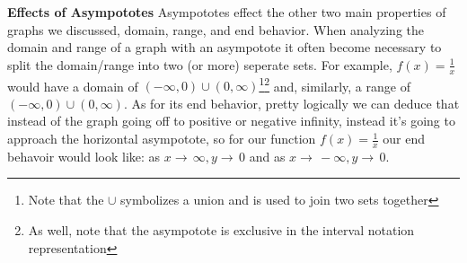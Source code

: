 \documentclass[addpoints]{exam}
\begin{document}
\begin{tcolorbox}[breakable, title=GENERAL FUNCTIONS, colframe=black, sharp corners, colback=white, colbacktitle=white, coltitle=black]
  \vspace{0.05in}
  \newline\large\textbf{Effects of Asympototes}
  \newline\normalsize Asympototes effect the other two main properties of graphs we discussed, domain, range, and end behavior. When analyzing the domain and range of a graph with an asympotote it often become necessary to split the domain/range into two (or more) seperate sets. For example, $f(x)=\frac{1}{x}$ would have a domain of $(-\infty, 0) \cup (0, \infty)$\footnote{Note that the $\cup$ symbolizes a union and is used to join two sets together}\footnote{As well, note that the asympotote is exclusive in the interval notation representation} and, similarly, a range of $(-\infty, 0) \cup (0, \infty)$. As for its end behavior, pretty logically we can deduce that instead of the graph going off to positive or negative infinity, instead it's going to approach the horizontal asympotote, so for our function $f(x)=\frac{1}{x}$ our end behavoir would look like: as $x\to\,\infty, y\to\,0$ and as $x\to\,-\infty, y\to\,0$.
\end{tcolorbox}
\end{document}
